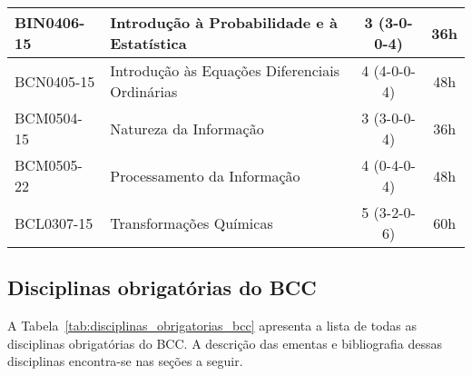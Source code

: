 \begin{table}[h!]
\begin{tabular}{|l|p{}|c|c|}
        BIN0406-15 & Introdução à Probabilidade e à Estatística & 3 (3-0-0-4) & 36h\\
        \hline
        BCN0405-15 & Introdução às Equações Diferenciais Ordinárias & 4 (4-0-0-4) & 48h \\
        \hline
        BCM0504-15 & Natureza da Informação & 3 (3-0-0-4) & 36h\\
        \hline
        BCM0505-22 & Processamento da Informação & 4 (0-4-0-4) & 48h\\
        \hline
        BCL0307-15 & Transformações Químicas & 5 (3-2-0-6) & 60h\\
        \hline
    \end{tabular}
\end{table}


\subsection{Disciplinas obrigatórias do BCC}
\label{sec:disciplinas_obrigatorais_ementas}

A Tabela~\ref{tab:disciplinas_obrigatorias_bcc} apresenta a lista de todas as
disciplinas obrigatórias do BCC.
A descrição das ementas e bibliografia dessas disciplinas encontra-se nas
seções a seguir.


